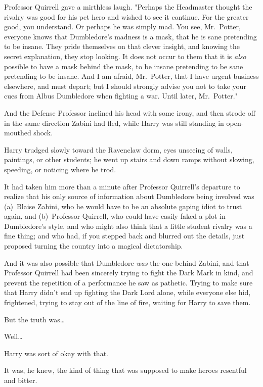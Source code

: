 Professor Quirrell gave a mirthless laugh. "Perhaps the Headmaster thought the
rivalry was good for his pet hero and wished to see it continue. For the
greater good, you understand. Or perhaps he was simply mad. You see,
Mr.~Potter, everyone knows that Dumbledore's madness is a mask, that he is sane
pretending to be insane. They pride themselves on that clever insight, and
knowing the secret explanation, they stop looking. It does not occur to them
that it is \emph{also} possible to have a mask behind the mask, to be insane
pretending to be sane pretending to be insane. And I am afraid, Mr.~Potter,
that I have urgent business elsewhere, and must depart; but I should strongly
advise you not to take your cues from Albus Dumbledore when fighting a war.
Until later, Mr.~Potter."

And the Defense Professor inclined his head with some irony, and then strode
off in the same direction Zabini had fled, while Harry was still standing in
open-mouthed shock.

Harry trudged slowly toward the Ravenclaw dorm, eyes unseeing of walls,
paintings, or other students; he went up stairs and down ramps without slowing,
speeding, or noticing where he trod.

It had taken him more than a minute after Professor Quirrell's departure to
realize that his only source of information about Dumbledore being involved was
(a)~Blaise Zabini, who he would have to be an absolute gaping idiot to trust
again, and (b)~Professor Quirrell, who could have easily faked a plot in
Dumbledore's style, and who might also think that a little student rivalry was
a fine thing; and who had, if you stepped back and blurred out the details,
just proposed turning the country into a magical dictatorship.

And it was also possible that Dumbledore \emph{was} the one behind Zabini, and
that Professor Quirrell had been sincerely trying to fight the Dark Mark in
kind, and prevent the repetition of a performance he saw as pathetic. Trying to
make sure that Harry didn't end up fighting the Dark Lord alone, while everyone
else hid, frightened, trying to stay out of the line of fire, waiting for Harry
to save them.

But the truth was{\ldots}

Well{\ldots}

Harry was sort of okay with that.

It was, he knew, the kind of thing that was supposed to make heroes resentful
and bitter.

